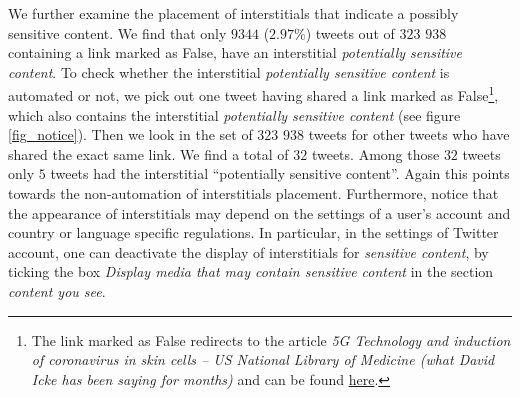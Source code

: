 \documentclass{article}
\begin{document}
\smallskip

We further examine the placement of interstitials that indicate a possibly sensitive content. We find that only $9344$ ($2.97\%$) tweets out of $323$ $938$ containing a link marked as False, have an interstitial {\it potentially sensitive content}. To check whether the interstitial {\it potentially sensitive content} is automated or not, we pick out one tweet having shared a link marked as False\footnote{The link marked as False redirects to the article {\it 5G Technology and induction of coronavirus in skin cells – US National Library of Medicine (what David Icke has been saying for months) } and can be found \href{https://davidicke.com/2020/07/22/5g-technology-and-induction-of-coronavirus-in-skin-cells-us-national-library-of-medicine-what-david-icke-has-been-saying-for-months/}{here}.}, which also contains the interstitial {\it potentially sensitive content} (see figure \ref{fig_notice}). Then we look in the set of $323$ $938$ tweets for other tweets who have shared the exact same link. We find a total of $32$ tweets. Among those $32$ tweets only $5$ tweets had the interstitial ``potentially sensitive content''. Again this points towards the non-automation of interstitials placement. Furthermore, notice that the appearance of interstitials may depend on the settings of a user's account and country or language specific regulations. In particular, in the settings of Twitter account, one can deactivate the display of interstitials for {\it sensitive content}, by ticking the box {\it Display media that may contain sensitive content} in the section {\it content you see}.

\smallskip
\end{document}
